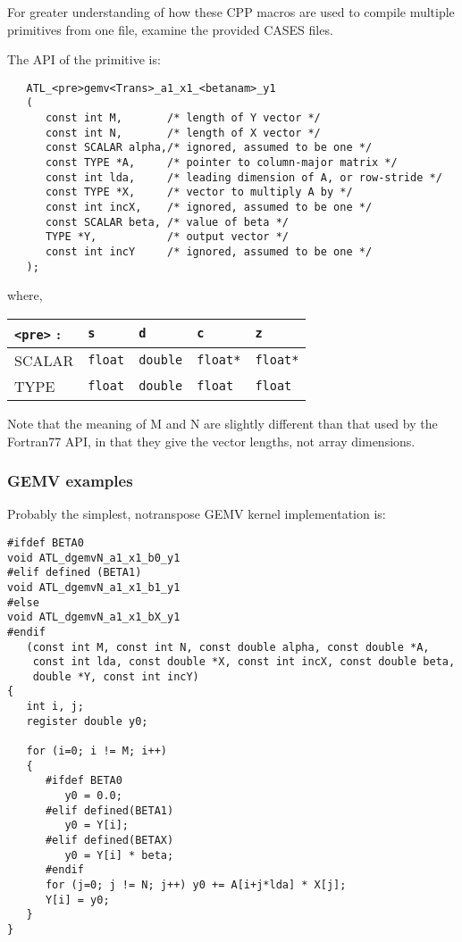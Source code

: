 \documentclass[11pt]{article}
\begin{document}
{For greater understanding of how these CPP macros are used to compile multiple
primitives from one file, examine the provided CASES files.

The API of the primitive is:
\begin{verbatim}
   ATL_<pre>gemv<Trans>_a1_x1_<betanam>_y1
   (
      const int M,       /* length of Y vector */
      const int N,       /* length of X vector */
      const SCALAR alpha,/* ignored, assumed to be one */
      const TYPE *A,     /* pointer to column-major matrix */
      const int lda,     /* leading dimension of A, or row-stride */
      const TYPE *X,     /* vector to multiply A by */
      const int incX,    /* ignored, assumed to be one */
      const SCALAR beta, /* value of beta */
      TYPE *Y,           /* output vector */
      const int incY     /* ignored, assumed to be one */
   );
\end{verbatim}

where,
\begin{tabular}{||l|l|l|l|l||}\hline\hline
\verb+<pre>+ : & {\tt s} & {\tt d} & {\tt c} & {\tt z} \\\hline\hline
SCALAR & {\tt float} & {\tt double} & {\tt float*} & {\tt float*} \\\hline
TYPE   & {\tt float} & {\tt double} & {\tt float} & {\tt float} \\\hline\hline
\end{tabular}

Note that the meaning of M and N are slightly different than that used by the
Fortran77 API, in that they give the vector lengths, not array dimensions.

\subsubsection{GEMV examples}

Probably the simplest, notranspose GEMV kernel implementation is:
\begin{verbatim}
#ifdef BETA0
void ATL_dgemvN_a1_x1_b0_y1
#elif defined (BETA1)
void ATL_dgemvN_a1_x1_b1_y1
#else
void ATL_dgemvN_a1_x1_bX_y1
#endif
   (const int M, const int N, const double alpha, const double *A, 
    const int lda, const double *X, const int incX, const double beta,
    double *Y, const int incY)
{
   int i, j;
   register double y0;

   for (i=0; i != M; i++)
   {
      #ifdef BETA0
         y0 = 0.0;
      #elif defined(BETA1)
         y0 = Y[i];
      #elif defined(BETAX)
         y0 = Y[i] * beta;
      #endif
      for (j=0; j != N; j++) y0 += A[i+j*lda] * X[j];
      Y[i] = y0;
   }
}
\end{verbatim}

}
\end{document}
